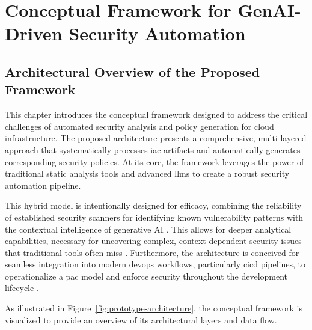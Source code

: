 \chapter{Conceptual Framework for GenAI-Driven Security Automation}

\section{Architectural Overview of the Proposed Framework}

This chapter introduces the conceptual framework designed to address the critical challenges of automated security analysis and policy generation for cloud infrastructure. The proposed architecture presents a comprehensive, multi-layered approach that systematically processes \gls{iac} artifacts and automatically generates corresponding security policies. At its core, the framework leverages the power of traditional static analysis tools and advanced \glspl{llm} to create a robust security automation pipeline.

This hybrid model is intentionally designed for efficacy, combining the reliability of established security scanners for identifying known vulnerability patterns with the contextual intelligence of generative AI \cite{khanna_enhancing_2024}. This allows for deeper analytical capabilities, necessary for uncovering complex, context-dependent security issues that traditional tools often miss \cite{akiri_generative_2025}. Furthermore, the architecture is conceived for seamless integration into modern \gls{devops} workflows, particularly \gls{cicd} pipelines, to operationalize a \gls{pac} model and enforce security throughout the development lifecycle \cite{khanna_enhancing_2024}.

As illustrated in Figure~\ref{fig:prototype-architecture}, the conceptual framework is visualized to provide an overview of its architectural layers and data flow.

